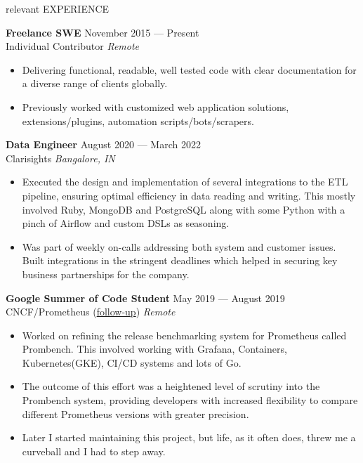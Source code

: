 \documentclass{resume} %
\begin{document}
\begin{rSection}{relevant EXPERIENCE}

  \textbf{Freelance SWE} \hfill November 2015 — Present\\
  Individual Contributor \hfill \textit{Remote}
  \begin{itemize}
    \itemsep -3pt {}
    \item Delivering functional, readable, well tested code with clear documentation for a diverse range of clients globally.
    \item Previously worked with customized web application solutions, extensions/plugins, automation scripts/bots/scrapers.
  \end{itemize}

  \textbf{Data Engineer} \hfill August 2020 — March 2022\\
  Clarisights \hfill \textit{Bangalore, IN}
  \begin{itemize}
    \itemsep -3pt {}
    \item Executed the design and implementation of several integrations to the ETL pipeline, ensuring optimal efficiency in data reading and writing. This mostly involved Ruby, MongoDB and PostgreSQL along with some Python with a pinch of Airflow and custom DSLs as seasoning.
    \item Was part of weekly on-calls addressing both system and customer issues. Built integrations in the stringent deadlines which helped in securing key business partnerships for the company.
  \end{itemize}

  \textbf{Google Summer of Code Student} \hfill May 2019 — August 2019\\
  CNCF/Prometheus (\href{https://blog.geekodour.org/posts/gsoc19/}{follow-up}) \hfill \textit{Remote}
  \begin{itemize}
    \itemsep -3pt {}
    \item Worked on refining the release benchmarking system for Prometheus called Prombench. This involved working with Grafana, Containers, Kubernetes(GKE), CI/CD systems and lots of Go.
    \item The outcome of this effort was a heightened level of scrutiny into the Prombench system, providing developers with increased flexibility to compare different Prometheus versions with greater precision.
    \item Later I started maintaining this project, but life, as it often does, threw me a curveball and I had to step away.
  \end{itemize}


\end{rSection}
\end{document}
